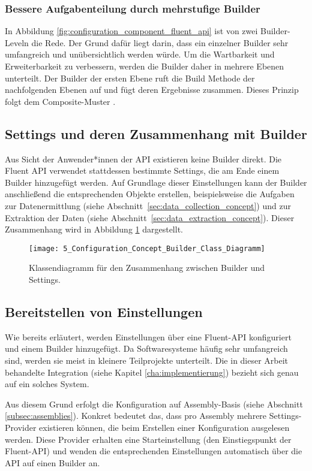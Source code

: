 \subsubsection{Bessere Aufgabenteilung durch mehrstufige Builder}
In Abbildung \ref{fig:configuration_component_fluent_api} ist von zwei Builder-Leveln die Rede. Der Grund dafür liegt darin, dass ein einzelner Builder sehr umfangreich und unübersichtlich werden würde. Um die Wartbarkeit und Erweiterbarkeit zu verbessern, werden die Builder daher in mehrere Ebenen unterteilt.  
Der Builder der ersten Ebene ruft die Build Methode der nachfolgenden Ebenen auf und fügt deren Ergebnisse zusammen. Dieses Prinzip folgt dem Composite-Muster \cite{gamma1995design}.

\subsection{Settings und deren Zusammenhang mit Builder}
Aus Sicht der Anwender*innen der API existieren keine Builder direkt. Die Fluent API verwendet stattdessen bestimmte Settings, die am Ende einem Builder hinzugefügt werden. Auf Grundlage dieser Einstellungen kann der Builder anschließend die entsprechenden Objekte erstellen, beispielsweise die Aufgaben zur Datenermittlung (siehe Abschnitt~\ref{sec:data_collection_concept}) und zur Extraktion der Daten (siehe Abschnitt~\ref{sec:data_extraction_concept}).  
Dieser Zusammenhang wird in Abbildung \ref{fig:builder_and_settings_cooperation} dargestellt.

\begin{figure}[H]
    \centering
    \texttt{[image: 5\_Configuration\_Concept\_Builder\_Class\_Diagramm]}
    \caption{Klassendiagramm für den Zusammenhang zwischen Builder und Settings.}
    \label{fig:builder_and_settings_cooperation}
\end{figure}

\subsection{Bereitstellen von Einstellungen}
Wie bereits erläutert, werden Einstellungen über eine Fluent-API konfiguriert und einem Builder hinzugefügt. Da Softwaresysteme häufig sehr umfangreich sind, werden sie meist in kleinere Teilprojekte unterteilt. Die in dieser Arbeit behandelte Integration (siehe Kapitel \ref{cha:implementierung}) bezieht sich genau auf ein solches System.

Aus diesem Grund erfolgt die Konfiguration auf Assembly-Basis (siehe Abschnitt \ref{subsec:assemblies}). Konkret bedeutet das, dass pro Assembly mehrere Settings-Provider existieren können, die beim Erstellen einer Konfiguration ausgelesen werden. Diese Provider erhalten eine Starteinstellung (den Einstiegspunkt der Fluent-API) und wenden die entsprechenden Einstellungen automatisch über die API auf einen Builder an.

